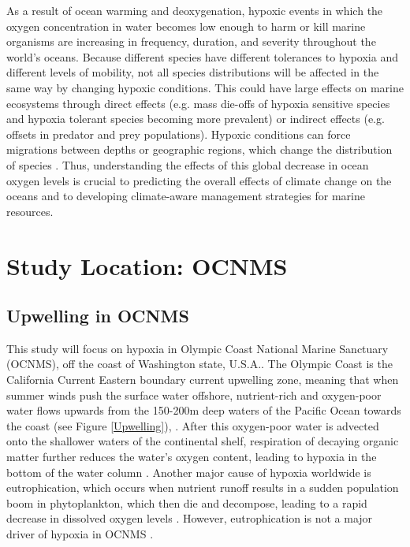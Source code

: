 \documentclass[12pt,twoside]{reedthesis}
\begin{document}
As a result of ocean warming and deoxygenation, hypoxic events in which the oxygen concentration in water becomes low enough to harm or kill marine organisms are increasing in frequency, duration, and severity throughout the world's oceans. Because different species have different tolerances to hypoxia and different levels of mobility, not all species distributions will be affected in the same way by changing hypoxic conditions. This could have large effects on marine ecosystems through direct effects (e.g. mass die-offs of hypoxia sensitive species and hypoxia tolerant species becoming more prevalent) or indirect effects (e.g. offsets in predator and prey populations). Hypoxic conditions can force migrations between depths or geographic regions, which change the distribution of species \autocite{Deutsch2024, Pihl1991}. Thus, understanding the effects of this global decrease in ocean oxygen levels is crucial to predicting the overall effects of climate change on the oceans and to developing climate-aware management strategies for marine resources. 

\section{Study Location: OCNMS}

\subsection{Upwelling in OCNMS}

This study will focus on hypoxia in Olympic Coast National Marine Sanctuary (OCNMS), off the coast of Washington state, U.S.A.. The Olympic Coast is the California Current Eastern boundary current upwelling zone, meaning that when summer winds push the surface water offshore, nutrient-rich and oxygen-poor water flows upwards from the 150-200m deep waters of the Pacific Ocean towards the coast (see Figure \ref{Upwelling}), \autocite{OfficeofNationalMarineSanctuaries2022, Hickey2003}. After this oxygen-poor water is advected onto the shallower waters of the continental shelf, respiration of decaying organic matter further reduces the water's oxygen content, leading to hypoxia in the bottom of the water column \autocite{Pierce2012, Landry1989}. Another major cause of hypoxia worldwide is eutrophication, which occurs when nutrient runoff results in a sudden population boom in phytoplankton, which then die and decompose, leading to a rapid decrease in dissolved oxygen levels \autocite{Deutsch2024}. However, eutrophication is not a major driver of hypoxia in OCNMS \autocite{OfficeofNationalMarineSanctuaries2022}.
\end{document}
